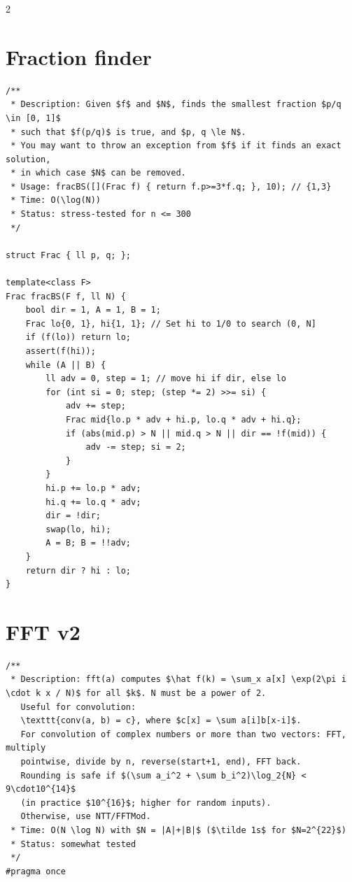 \documentclass[a4paper,landscape]{article}
\begin{document}
\begin{multicols}{2}
\section{Fraction finder}
\hline
\begin{lstlisting}
/**
 * Description: Given $f$ and $N$, finds the smallest fraction $p/q \in [0, 1]$
 * such that $f(p/q)$ is true, and $p, q \le N$.
 * You may want to throw an exception from $f$ if it finds an exact solution,
 * in which case $N$ can be removed.
 * Usage: fracBS([](Frac f) { return f.p>=3*f.q; }, 10); // {1,3}
 * Time: O(\log(N))
 * Status: stress-tested for n <= 300
 */

struct Frac { ll p, q; };

template<class F>
Frac fracBS(F f, ll N) {
	bool dir = 1, A = 1, B = 1;
	Frac lo{0, 1}, hi{1, 1}; // Set hi to 1/0 to search (0, N]
	if (f(lo)) return lo;
	assert(f(hi));
	while (A || B) {
		ll adv = 0, step = 1; // move hi if dir, else lo
		for (int si = 0; step; (step *= 2) >>= si) {
			adv += step;
			Frac mid{lo.p * adv + hi.p, lo.q * adv + hi.q};
			if (abs(mid.p) > N || mid.q > N || dir == !f(mid)) {
				adv -= step; si = 2;
			}
		}
		hi.p += lo.p * adv;
		hi.q += lo.q * adv;
		dir = !dir;
		swap(lo, hi);
		A = B; B = !!adv;
	}
	return dir ? hi : lo;
}
\end{lstlisting}
\hline
\section{FFT v2}
\hline
\begin{lstlisting}
/**
 * Description: fft(a) computes $\hat f(k) = \sum_x a[x] \exp(2\pi i \cdot k x / N)$ for all $k$. N must be a power of 2.
   Useful for convolution:
   \texttt{conv(a, b) = c}, where $c[x] = \sum a[i]b[x-i]$.
   For convolution of complex numbers or more than two vectors: FFT, multiply
   pointwise, divide by n, reverse(start+1, end), FFT back.
   Rounding is safe if $(\sum a_i^2 + \sum b_i^2)\log_2{N} < 9\cdot10^{14}$
   (in practice $10^{16}$; higher for random inputs).
   Otherwise, use NTT/FFTMod.
 * Time: O(N \log N) with $N = |A|+|B|$ ($\tilde 1s$ for $N=2^{22}$)
 * Status: somewhat tested
 */
#pragma once


\end{lstlisting}
\end{multicols}
\end{document}
